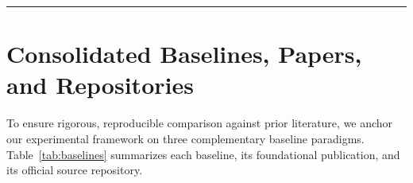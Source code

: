 ﻿\documentclass[11pt,a4paper]{article}
\begin{document}
	\vspace{0.4em}
	\hrule
	\vspace{0.8em}
	
	\begin{abstract}
		Following our consultation with TA \foreignlanguage{vietnamese}{Viết Thám}, this Week 7 report formalizes the concrete execution plan for the remainder of the Mathematical Information Retrieval (MathIR) project. First, we consolidate the three core baseline paradigms—Neural (\textbf{MathBERT} by Shen et al.), Structural Tree-based (\textbf{Tangent-CFT}), and Symbolic Computer Algebra (\textbf{SymPy CAS})—alongside their foundational research papers and official open-source repositories. Second, we specify the standardized MathIR competition benchmarks (\textbf{ARQMath}, \textbf{NTCIR-12 MathIR}, and \textbf{MIRB}) together with our adversarial diagnostic suite (\texttt{test\_bottlenecks.py}) and all associated dataset links. Finally, we detail our engineering and experimental plan to construct a \textbf{Multi-Stage Neuro-Symbolic Hybrid System} designed to overcome the semantic blindness, structural inversion errors, and cross-lingual degradation observed in pure text-based neural retrieval models, while explicitly addressing calibration, parser reliability, and partial-match risks.
	\end{abstract}
	
	\section{Consolidated Baselines, Papers, and Repositories}
	To ensure rigorous, reproducible comparison against prior literature, we anchor our experimental framework on three complementary baseline paradigms. Table~\ref{tab:baselines} summarizes each baseline, its foundational publication, and its official source repository.
\end{document}
